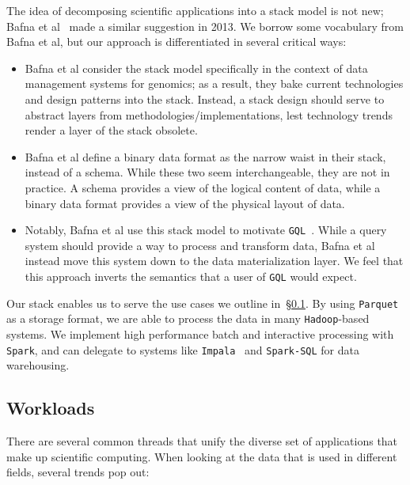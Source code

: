 \documentclass{acm_proc_article-sp}
\begin{document}
The idea of decomposing scientific applications into a stack model is not new; Bafna et al~\cite{bafna13}
made a similar suggestion in 2013. We borrow some vocabulary from Bafna et al, but our approach is
differentiated in several critical ways:

\begin{itemize}
\item Bafna et al consider the stack model specifically in the context of data management systems for
genomics; as a result, they bake current technologies and design patterns into the stack. Instead, a stack
design should serve to abstract layers from methodologies/implementations, lest technology trends render
a layer of the stack obsolete.
\item Bafna et al define a binary data format as the narrow waist in their stack, instead of a schema.
While these two seem interchangeable, they are not in practice. A schema provides a view of the logical content
of data, while a binary data format provides a view of the physical layout of data.
\item Notably, Bafna et al use this stack model to motivate \texttt{GQL}~\cite{kozanitis14}. While a query system
should provide a way to process and transform data, Bafna et al instead move this system down to the
data materialization layer. We feel that this approach inverts the semantics that a user of \texttt{GQL} would expect.
\end{itemize}

Our stack enables us to serve the use cases we outline in~\S\ref{sec:workloads}. By using
\texttt{Parquet} as a storage format, we are able to process the data in many \texttt{Hadoop}-based systems. We
implement high performance batch and interactive processing with \linebreak \texttt{Spark}, and can delegate to
systems like \texttt{Impala}~\cite{kornacker15} and \texttt{Spark-SQL} for data warehousing.

\subsection{Workloads}
\label{sec:workloads}

There are several common threads that unify the diverse set of applications that make up scientific
computing. When looking at the data that is used in different fields, several trends pop out:
\end{document}
